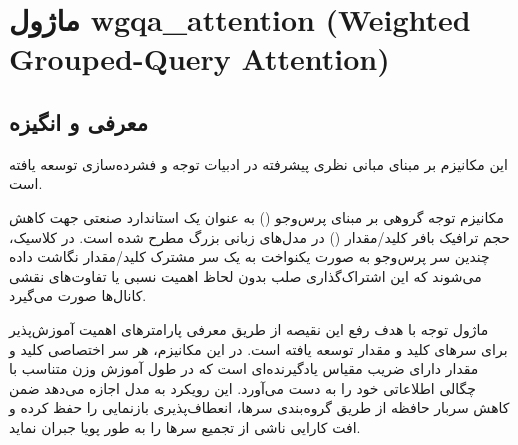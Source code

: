 \section{ماژول wgqa\_attention (Weighted Grouped-Query Attention)}
\label{sec:module_wgqa_attention}

\subsection{معرفی و انگیزه}
این مکانیزم بر مبنای مبانی نظری پیشرفته در ادبیات توجه و فشرده‌سازی \cite{ainslie2023gqa} توسعه یافته است.

مکانیزم توجه گروهی بر مبنای پرس‌وجو () به عنوان یک استاندارد صنعتی جهت کاهش حجم ترافیک بافر کلید/مقدار () در مدل‌های زبانی بزرگ مطرح شده است. در  کلاسیک، چندین سر پرس‌وجو به صورت یکنواخت به یک سر مشترک کلید/مقدار نگاشت داده می‌شوند که این اشتراک‌گذاری صلب بدون لحاظ اهمیت نسبی یا تفاوت‌های نقشی کانال‌ها صورت می‌گیرد.

ماژول توجه  با هدف رفع این نقیصه از طریق معرفی پارامترهای اهمیت آموزش‌پذیر برای سرهای کلید و مقدار توسعه یافته است. در این مکانیزم، هر سر اختصاصی کلید و مقدار دارای ضریب مقیاس یادگیرنده‌ای است که در طول آموزش وزن متناسب با چگالی اطلاعاتی خود را به دست می‌آورد. این رویکرد به مدل اجازه می‌دهد ضمن کاهش سربار حافظه از طریق گروه‌بندی سرها، انعطاف‌پذیری بازنمایی را حفظ کرده و افت کارایی ناشی از تجمیع سرها را به طور پویا جبران نماید.

